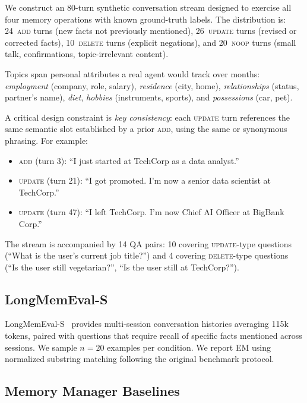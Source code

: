 \documentclass[10pt, twocolumn]{article}
\begin{document}
We construct an 80-turn synthetic conversation stream designed to
exercise all four memory operations with known ground-truth labels.
The distribution is: 24~\textsc{add} turns (new facts not previously
mentioned), 26~\textsc{update} turns (revised or corrected facts),
10~\textsc{delete} turns (explicit negations), and 20~\textsc{noop}
turns (small talk, confirmations, topic-irrelevant content).

Topics span personal attributes a real agent would track over months:
\emph{employment} (company, role, salary), \emph{residence} (city, home),
\emph{relationships} (status, partner's name), \emph{diet},
\emph{hobbies} (instruments, sports), and \emph{possessions} (car, pet).

A critical design constraint is \emph{key consistency}: each
\textsc{update} turn references the same semantic slot established by
a prior \textsc{add}, using the same or synonymous phrasing.
For example:
\begin{itemize}[leftmargin=*, itemsep=0pt, topsep=2pt]
  \item \textsc{add} (turn 3): ``I just started at TechCorp as a data analyst.''
  \item \textsc{update} (turn 21): ``I got promoted. I'm now a senior data
    scientist at TechCorp.''
  \item \textsc{update} (turn 47): ``I left TechCorp. I'm now Chief AI
    Officer at BigBank Corp.''
\end{itemize}

The stream is accompanied by 14 QA pairs: 10 covering \textsc{update}-type
questions (``What is the user's current job title?'') and 4 covering
\textsc{delete}-type questions (``Is the user still vegetarian?'',
``Is the user still at TechCorp?'').

\subsection{LongMemEval-S}
\label{sec:longmemeval}

LongMemEval-S~\cite{wu2024longmemeval} provides multi-session conversation
histories averaging 115k tokens, paired with questions that require recall
of specific facts mentioned across sessions.
We sample $n=20$ examples per condition.
We report EM using normalized substring matching following the original
benchmark protocol.

\subsection{Memory Manager Baselines}
\end{document}
